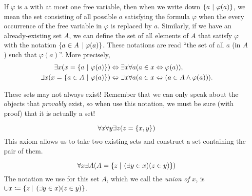 \begin{definition}
    If \(\varphi\) is a {\wff} with at most one free variable,
    then when we write down \(\set*{a \suchthat \varphi(a)}\),
    we mean the set consisting of all possible \(a\) satisfying the formula \(\varphi\)
    when the every occurrence of the free variable in \(\varphi\) is replaced by \(a\).
    Similarly, if we have an already-existing set \(A\),
    we can define the set of all elements of \(A\) that satisfy \(\varphi\)
    with the notation \(\set*{a \in A \suchthat \varphi(a)}\).
    These notations are read ``the set of all \(a\) (in \(A\)) such that \(\varphi(a)\)''.
    More precisely,
    \begin{align*}
        \exists x \pn*{x = \set*{a \suchthat \varphi(a)}}
            &\iff \exists x \forall a \pn*{a \in x \iff \varphi(a)},\\
        \exists x \pn*{x = \set*{a  \in A \suchthat \varphi(a)}}
            &\iff \exists x \forall a \pn*{a \in x \iff \pn*{a \in A \meet \varphi(a)}}.
    \end{align*}

    \begin{note}
        These sets may not always exist!
        Remember that we can only speak about the objects that \emph{provably} exist,
        so when use this notation,
        we must be sure (with proof) that it is actually a set!
    \end{note}
\end{definition}

\begin{axiom}[Pairing]\label{ax:pairing}
    \vspace{-\abovedisplayskip}
    \[\forall x \forall y \exists z \pn*{z = \set*{x, y}}\]
    This axiom allows us to take two existing sets and construct a set containing the pair of them.
\end{axiom}

\begin{axiom}[Union]\label{ax:union}
    \vspace{-\abovedisplayskip}
    \[
        \forall x \exists A \pn*{A = \set*{z \suchthat \pn*{\exists y \in x}\pn*{z \in y}}}
    \]
    The notation we use for this set \(A\), which we call the \emph{union of \(x\)},
    is \(\union x \defn \set*{z \suchthat \pn*{\exists y \in x}\pn*{z \in y}}\).
\end{axiom}

